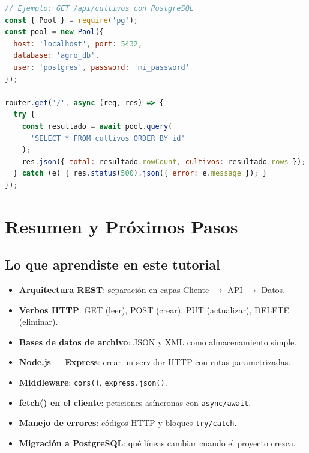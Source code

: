 \documentclass[12pt, a4paper]{article}
\begin{document}
\begin{tcolorbox}[codigoBox]
\begin{lstlisting}[style=jsStyle, language=JavaScript, morekeywords={const,require,await}]
// Ejemplo: GET /api/cultivos con PostgreSQL
const { Pool } = require('pg');
const pool = new Pool({
  host: 'localhost', port: 5432,
  database: 'agro_db',
  user: 'postgres', password: 'mi_password'
});

router.get('/', async (req, res) => {
  try {
    const resultado = await pool.query(
      'SELECT * FROM cultivos ORDER BY id'
    );
    res.json({ total: resultado.rowCount, cultivos: resultado.rows });
  } catch (e) { res.status(500).json({ error: e.message }); }
});
\end{lstlisting}
\end{tcolorbox}

\section{Resumen y Próximos Pasos}

\subsection{Lo que aprendiste en este tutorial}

\begin{itemize}[leftmargin=*, label={\color{verdeAgro}\faCheckCircle}]
  \item \textbf{Arquitectura REST}: separación en capas Cliente $\rightarrow$ API $\rightarrow$ Datos.
  \item \textbf{Verbos HTTP}: GET (leer), POST (crear), PUT (actualizar), DELETE (eliminar).
  \item \textbf{Bases de datos de archivo}: JSON y XML como almacenamiento simple.
  \item \textbf{Node.js + Express}: crear un servidor HTTP con rutas parametrizadas.
  \item \textbf{Middleware}: \texttt{cors()}, \texttt{express.json()}.
  \item \textbf{fetch() en el cliente}: peticiones asíncronas con \texttt{async/await}.
  \item \textbf{Manejo de errores}: códigos HTTP y bloques \texttt{try/catch}.
  \item \textbf{Migración a PostgreSQL}: qué líneas cambiar cuando el proyecto crezca.
\end{itemize}
\end{document}
